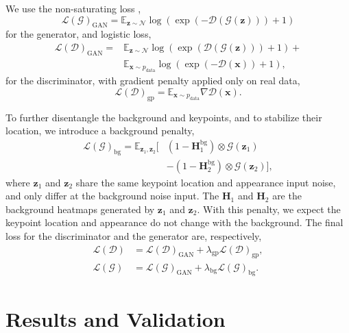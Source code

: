 \documentclass[10pt, conference, compsocconf]{IEEEtran}
\newcommand{\vx}{\mathbf{x}}
\newcommand{\vz}{\mathbf{z}}
\newcommand{\mH}{\mathbf{H}}
\newcommand{\cD}{\mathcal D}
\newcommand{\cG}{\mathcal G}
\newcommand{\cL}{\mathcal L}
\newcommand{\cN}{\mathcal N}
\begin{document}
 We use the non-saturating loss \cite{goodfellow2014generative},
\begin{equation}
    \cL(\cG)_\text{GAN}=\mathbb E_{\vz\sim\cN}\log(\exp(-\cD(\cG(\vz)))+1)
\label{eq:gen_loss}
\end{equation}
for the generator, and logistic loss,
\begin{equation}
    \begin{aligned}
        \cL(\cD)_\text{GAN}=&\mathbb E_{\vz\sim\cN}\log(\exp(\cD(\cG(\vz)))+1)+\\
        &\mathbb E_{\vx\sim p_\text{data}}\log(\exp(-\cD(\vx))+1),
     \end{aligned}
\label{eq:dis_loss}
\end{equation}
for the discriminator, with gradient penalty \cite{mescheder2018training} applied only on real data,
\begin{equation}
    \cL(\cD)_\text{gp}=\mathbb E_{\vx\sim p_\text{data}}\nabla\cD(\vx).
\label{eq:gradient penalty}
\end{equation}


 To further disentangle the background and keypoints, and to stabilize their location, we introduce a background penalty,
\begin{equation}
\begin{aligned}
    \cL(\cG)_\text{bg}=\mathbb E_{\vz_1,\vz_2} [ &(1-\mH^\text{bg}_1) \otimes \cG(\vz_1)\\
    &-(1-\mH^\text{bg}_2) \otimes \cG(\vz_2)],
\end{aligned}
    \label{eq:bg_loss}
\end{equation}
where $\vz_1$ and $\vz_2$ share the same keypoint location and appearance input noise, and only differ at the background noise input. The $\mH_1$ and $\mH_2$ are the background heatmaps generated by $\vz_1$ and $\vz_2$. With this penalty, we expect the keypoint location and appearance do not change with the background.
The final loss for the discriminator and the generator are, respectively,
\begin{equation}
    \begin{aligned}
        \cL(\cD)&=\cL(\cD)_\text{GAN} + \lambda_\text{gp}\cL(\cD)_\text{gp},\\
        \cL(\cG)&=\cL(\cG)_\text{GAN} + \lambda_\text{bg}\cL(\cG)_\text{bg}.
     \end{aligned}
\end{equation}
 \section{Results and Validation}   \label{experiments}
\end{document}
